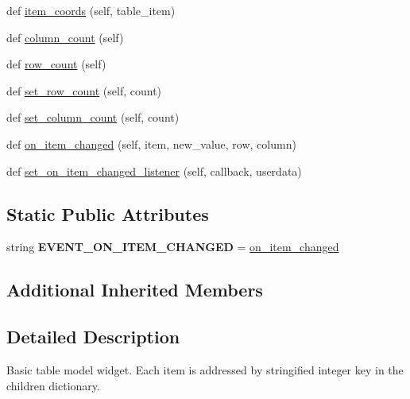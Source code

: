 \begin{DoxyCompactItemize}
\item 
def \hyperlink{classremi_1_1gui_1_1TableWidget_ac7e5bb14d4ef59a0be1b5a2bd0e8ccb8}{item\+\_\+coords} (self, table\+\_\+item)
\item 
def \hyperlink{classremi_1_1gui_1_1TableWidget_a4a15eaf75be49c70f7565a8959f1ac7e}{column\+\_\+count} (self)
\item 
def \hyperlink{classremi_1_1gui_1_1TableWidget_a159fb69684ef04c24c431ee9b1a886c2}{row\+\_\+count} (self)
\item 
def \hyperlink{classremi_1_1gui_1_1TableWidget_a7285e72d46c2fc90cd439a74a7d3fea1}{set\+\_\+row\+\_\+count} (self, count)
\item 
def \hyperlink{classremi_1_1gui_1_1TableWidget_afc003e25fc2c6b56b4be6e5e1be84eda}{set\+\_\+column\+\_\+count} (self, count)
\item 
def \hyperlink{classremi_1_1gui_1_1TableWidget_a6f2e578d9fee320d5b1ec66a79659142}{on\+\_\+item\+\_\+changed} (self, item, new\+\_\+value, row, column)
\item 
def \hyperlink{classremi_1_1gui_1_1TableWidget_a2d3eb5a940379cc06b4bf547066f141e}{set\+\_\+on\+\_\+item\+\_\+changed\+\_\+listener} (self, callback, userdata)
\end{DoxyCompactItemize}
\subsection*{Static Public Attributes}
\begin{DoxyCompactItemize}
\item 
string {\bfseries E\+V\+E\+N\+T\+\_\+\+O\+N\+\_\+\+I\+T\+E\+M\+\_\+\+C\+H\+A\+N\+G\+ED} = \textquotesingle{}\hyperlink{classremi_1_1gui_1_1TableWidget_a6f2e578d9fee320d5b1ec66a79659142}{on\+\_\+item\+\_\+changed}\textquotesingle{}\hypertarget{classremi_1_1gui_1_1TableWidget_a9f068a238371afd81068527e089d288b}{}\label{classremi_1_1gui_1_1TableWidget_a9f068a238371afd81068527e089d288b}

\end{DoxyCompactItemize}
\subsection*{Additional Inherited Members}


\subsection{Detailed Description}
\begin{DoxyVerb}Basic table model widget.
Each item is addressed by stringified integer key in the children dictionary.
\end{DoxyVerb}
 

